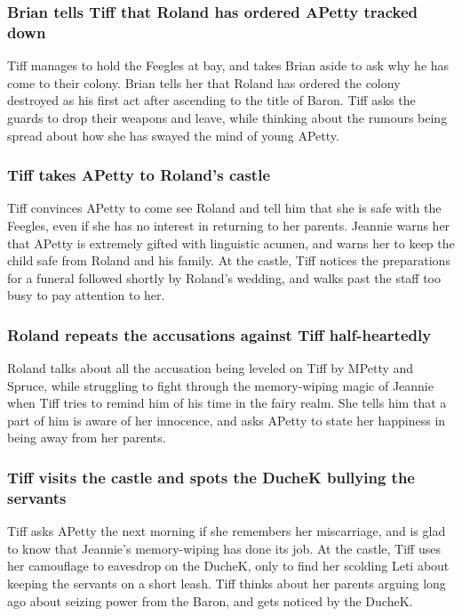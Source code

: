 \subsubsection{\Gls{Brian} tells \Gls{Tiff} that \Gls{Roland} has ordered \Gls{APetty} tracked
    down}
\Gls{Tiff} manages to hold the Feegles at bay, and takes \Gls{Brian} aside to ask why he has come
to their colony. \Gls{Brian} tells her that \Gls{Roland} has ordered the colony destroyed as his
first act after ascending to the title of Baron. \Gls{Tiff} asks the guards to drop their weapons
and leave, while thinking about the rumours being spread about how she has swayed the mind of
young \Gls{APetty}.

\subsubsection{\Gls{Tiff} takes \Gls{APetty} to \Gls{Roland}'s castle}
\Gls{Tiff} convinces \Gls{APetty} to come see \Gls{Roland} and tell him that she is safe with the
Feegles, even if she has no interest in returning to her parents. \Gls{Jeannie} warns her that
\Gls{APetty} is extremely gifted with linguistic acumen, and warns her to keep the child safe from
\Gls{Roland} and his family. At the castle, \Gls{Tiff} notices the preparations for a funeral
followed shortly by \Gls{Roland}'s wedding, and walks past the staff too busy to pay attention to
her.

\subsubsection{\Gls{Roland} repeats the accusations against \Gls{Tiff} half-heartedly}
\Gls{Roland} talks about all the accusation being leveled on \Gls{Tiff} by \Gls{MPetty} and
\Gls{Spruce}, while struggling to fight through the memory-wiping magic of \Gls{Jeannie} when
\Gls{Tiff} tries to remind him of his time in the fairy realm. She tells him that a part of him is
aware of her innocence, and asks \Gls{APetty} to state her happiness in being away from her parents.

\subsubsection{\Gls{Tiff} visits the castle and spots the \Gls{DucheK} bullying the servants}
\Gls{Tiff} asks \Gls{APetty} the next morning if she remembers her miscarriage, and is glad to know
that \Gls{Jeannie}'s memory-wiping has done its job. At the castle, \Gls{Tiff} uses her camouflage
to eavesdrop on the \Gls{DucheK}, only to find her scolding \Gls{Leti} about keeping the servants
on a short leash. \Gls{Tiff} thinks about her parents arguing long ago about seizing power from the
\Gls{Baron}, and gets noticed by the \Gls{DucheK}.

